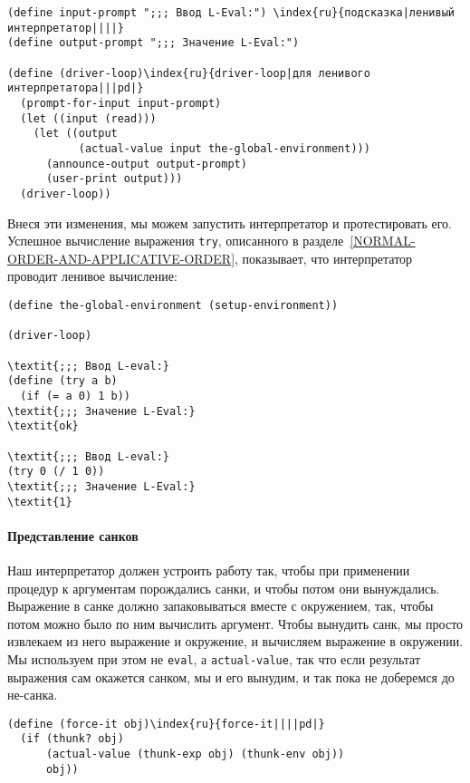 \begin{Verbatim}[fontsize=\small]
(define input-prompt ";;; Ввод L-Eval:") \index{ru}{подсказка|ленивый интерпретатор||||}
(define output-prompt ";;; Значение L-Eval:")

(define (driver-loop)\index{ru}{driver-loop|для ленивого интерпретатора|||pd|}
  (prompt-for-input input-prompt)
  (let ((input (read)))
    (let ((output
           (actual-value input the-global-environment)))
      (announce-output output-prompt)
      (user-print output)))
  (driver-loop))
\end{Verbatim}

Внеся эти изменения, мы можем запустить
интерпретатор и протестировать его.  Успешное вычисление выражения
{\tt try}, описанного в 
разделе~\ref{NORMAL-ORDER-AND-APPLICATIVE-ORDER}, показывает, что
интерпретатор проводит ленивое вычисление:

\begin{Verbatim}[fontsize=\small]
(define the-global-environment (setup-environment))

(driver-loop)

\textit{;;; Ввод L-eval:}
(define (try a b)
  (if (= a 0) 1 b))
\textit{;;; Значение L-Eval:}
\textit{ok}

\textit{;;; Ввод L-eval:}
(try 0 (/ 1 0))
\textit{;;; Значение L-Eval:}
\textit{1}
\end{Verbatim}

\paragraph{Представление санков}

Наш интерпретатор должен устроить работу 
так, чтобы при
применении процедур к аргументам порождались санки, и чтобы потом они
вынуждались.  Выражение в санке должно запаковываться вместе с
окружением, так, чтобы потом можно было по ним вычислить аргумент.  Чтобы
вынудить санк, мы просто извлекаем из него выражение и окружение, и
вычисляем выражение в окружении.  Мы используем при этом не
{\tt eval}, а {\tt actual-value}, так что если результат
выражения сам окажется санком, мы и его вынудим, и так пока не
доберемся до не-санка.

\begin{Verbatim}[fontsize=\small]
(define (force-it obj)\index{ru}{force-it||||pd|}
  (if (thunk? obj)
      (actual-value (thunk-exp obj) (thunk-env obj))
      obj))
\end{Verbatim}

